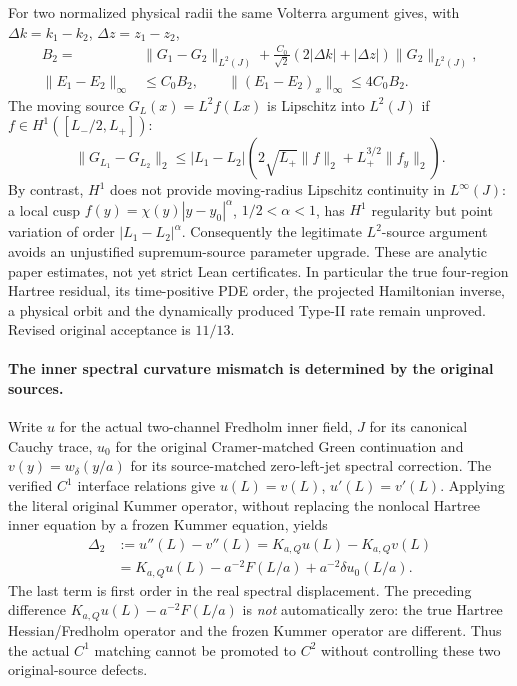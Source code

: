\documentclass[11pt]{amsart}
\begin{document}
For two normalized physical radii the same Volterra argument gives,
with \(\Delta k=k_1-k_2\), \(\Delta z=z_1-z_2\),
\[
\begin{split}
B_2={}&\|G_1-G_2\|_{L^2(J)}
+\frac{C_0}{\sqrt2}
(2|\Delta k|+|\Delta z|)\|G_2\|_{L^2(J)},\\
\|E_1-E_2\|_\infty&\le C_0B_2,\qquad
\|(E_1-E_2)_x\|_\infty\le4C_0B_2.
\end{split}
\]
The moving source \(G_L(x)=L^2 f(Lx)\) is Lipschitz into
\(L^2(J)\) if \(f\in H^1([L_-/2,L_+])\):
\[
\|G_{L_1}-G_{L_2}\|_2
\le|L_1-L_2|\left(2\sqrt{L_+}\|f\|_2+
L_+^{3/2}\|f_y\|_2\right).
\]
By contrast, \(H^1\) does not provide moving-radius Lipschitz
continuity in \(L^\infty(J)\): a local cusp
\(f(y)=\chi(y)|y-y_0|^\alpha\), \(1/2<\alpha<1\),
has \(H^1\) regularity but point variation of order
\(|L_1-L_2|^\alpha\). Consequently the legitimate
\(L^2\)-source argument avoids an unjustified
supremum-source parameter upgrade. These are analytic
paper estimates, not yet strict Lean certificates.
In particular the true four-region Hartree residual,
its time-positive PDE order, the projected Hamiltonian inverse,
a physical orbit and the dynamically produced Type-II rate
remain unproved. Revised original acceptance is \(11/13\).


\paragraph{The inner spectral curvature mismatch is determined by the original sources.}
Write \(u\) for the actual two-channel Fredholm inner field,
\(J\) for its canonical Cauchy trace, \(u_0\) for the original
Cramer-matched Green continuation and
\(v(y)=w_\delta(y/a)\) for its source-matched zero-left-jet spectral
correction. The verified \(C^1\) interface relations give
\(u(L)=v(L)\), \(u'(L)=v'(L)\).
Applying the literal original Kummer operator, without replacing the
nonlocal Hartree inner equation by a frozen Kummer equation, yields
\[
\begin{split}
\Delta_2
&:=u''(L)-v''(L)
 =K_{a,Q}u(L)-K_{a,Q}v(L)\\
&=K_{a,Q}u(L)-a^{-2}F(L/a)
  +a^{-2}\delta u_0(L/a).
\end{split}
\]
The last term is first order in the real spectral displacement.
The preceding difference \(K_{a,Q}u(L)-a^{-2}F(L/a)\) is
\emph{not} automatically zero: the true Hartree Hessian/Fredholm
operator and the frozen Kummer operator are different.
Thus the actual \(C^1\) matching cannot be promoted to \(C^2\)
without controlling these two original-source defects.
\end{document}
